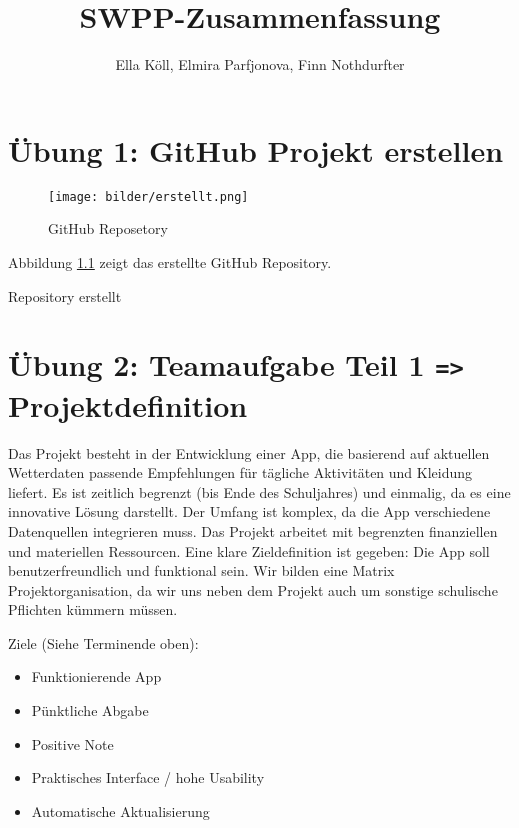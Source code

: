 \documentclass[a4paper,12pt]{report}
\title{SWPP-Zusammenfassung}
\author{Ella Köll, Elmira Parfjonova, Finn Nothdurfter}
\begin{document}
    \maketitle
    \tableofcontents



    \chapter{Übung 1: GitHub Projekt erstellen}

    \begin{figure}[H]
        \centering
        \texttt{[image: bilder/erstellt.png]}
        \caption{GitHub Reposetory}
        \label{fig:portrait}
    \end{figure}

    Abbildung \ref{fig:portrait} zeigt das erstellte GitHub Repository.

    Repository erstellt



    \chapter{Übung 2: Teamaufgabe Teil 1 \texttt{=>} Projektdefinition}
    

Das Projekt besteht in der Entwicklung einer App, die basierend auf aktuellen Wetterdaten passende Empfehlungen für tägliche Aktivitäten und Kleidung liefert. Es ist zeitlich begrenzt (bis Ende des Schuljahres) und einmalig, da es eine innovative Lösung darstellt. Der Umfang ist komplex, da die App verschiedene Datenquellen integrieren muss. Das Projekt arbeitet mit begrenzten finanziellen und materiellen Ressourcen. Eine klare Zieldefinition ist gegeben: Die App soll benutzerfreundlich und funktional sein.
Wir bilden eine Matrix Projektorganisation, da wir uns neben dem Projekt auch um sonstige schulische Pflichten kümmern müssen.


\vspace{1cm}


Ziele (Siehe Terminende oben):
\begin{itemize}[label=-] 
    \item Funktionierende App
    \item Pünktliche Abgabe
    \item Positive Note
    \item Praktisches Interface / hohe Usability
    \item Automatische Aktualisierung
\end{itemize}
\end{document}
